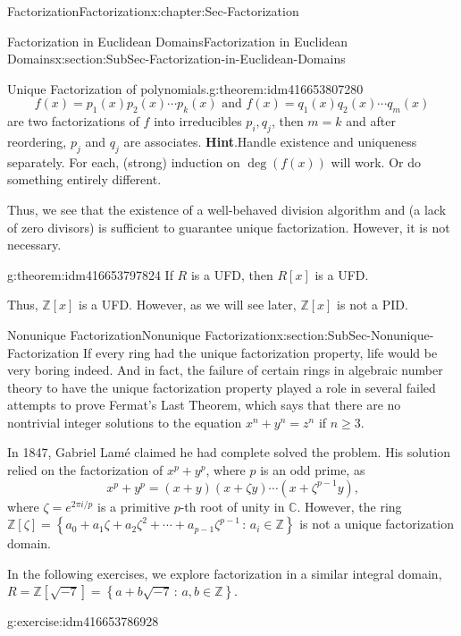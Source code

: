 \documentclass[oneside,10pt,]{book}
\numberwithin{equation}{section}
\renewcommand{\ge}{\geqslant}
\newcommand{\setof}[2]{{\left\{#1\,\colon\,#2\right\}}}
\def\C{{\mathbb C}}
\def\Z{{\mathbb Z}}
\begin{document}
\begin{chapterptx}{Factorization}{}{Factorization}{}{}{x:chapter:Sec-Factorization}
\begin{sectionptx}{Factorization in Euclidean Domains}{}{Factorization in Euclidean Domains}{}{}{x:section:SubSec-Factorization-in-Euclidean-Domains}
\begin{theorem}{Unique Factorization of polynomials.}{}{g:theorem:idm416653807280}
\begin{equation*}
f(x) = p_1(x) p_2(x) \cdots p_k(x) \text{ and }  f(x) = q_1(x) q_2(x) \cdots q_m(x)
\end{equation*}
are two factorizations of \(f\) into irreducibles \(p_i, q_j\), then \(m=k\) and after reordering, \(p_j\) and \(q_j\) are associates.%
\textbf{Hint}.\quad{}Handle existence and uniqueness separately. For each, (strong) induction on \(\deg(f(x))\) will work. Or do something entirely different.%
\end{theorem}
Thus, we see that the existence of a well-behaved division algorithm and (a lack of zero divisors) is sufficient to guarantee unique factorization. However, it is not necessary.%
\begin{theorem}{}{}{g:theorem:idm416653797824}%
If \(R\) is a UFD, then \(R[x]\) is a UFD.%
\end{theorem}
Thus, \(\Z[x]\) is a UFD. However, as we will see later, \(\Z[x]\) is not a PID.%
\end{sectionptx}
%
%
\typeout{************************************************}
\typeout{************************************************}
%
\begin{sectionptx}{Nonunique Factorization}{}{Nonunique Factorization}{}{}{x:section:SubSec-Nonunique-Factorization}
If every ring had the unique factorization property, life would be very boring indeed. And in fact, the failure of certain rings in algebraic number theory to have the unique factorization property played a role in several failed attempts to prove Fermat's Last Theorem, which says that there are no nontrivial integer solutions to the equation \(x^n + y^n = z^n\) if \(n \ge 3\).%
\par
In 1847, Gabriel Lamé claimed he had complete solved the problem. His solution relied on the factorization of \(x^p + y^p\), where \(p\) is an odd prime, as%
\begin{equation*}
x^p + y^p = (x+y)(x+\zeta y) \cdots (x+\zeta^{p-1}y)\text{,}
\end{equation*}
where \(\zeta = e^{2\pi i/p}\) is a primitive \(p\)-th root of unity in \(\C\). However, the ring \(\Z[\zeta] = \setof{a_0 + a_1 \zeta + a_2 \zeta^2 + \cdots + a_{p-1} \zeta^{p-1}}{a_i\in\Z}\) is not a unique factorization domain.%
\par
In the following exercises, we explore factorization in a similar integral domain, \(R = \Z[\sqrt{-7}] = \setof{a+b\sqrt{-7}}{a,b\in\Z}\).%
\begin{inlineexercise}{}{g:exercise:idm416653786928}%

\end{inlineexercise}
\end{sectionptx}
\end{chapterptx}
\end{document}
